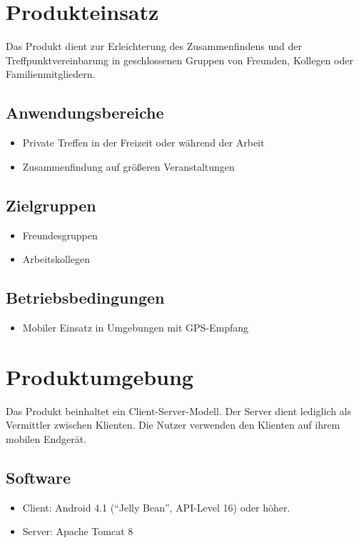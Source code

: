 \documentclass[parskip=full,11pt]{scrartcl}
\begin{document}
\pagebreak
\section{Produkteinsatz}
Das Produkt dient zur Erleichterung des Zusammenfindens und der
Treffpunktvereinbarung in geschlossenen Gruppen von Freunden, Kollegen oder
Familienmitgliedern.

\subsection{Anwendungsbereiche}
\begin{itemize}
    \item Private Treffen in der Freizeit oder während der Arbeit
    \item Zusammenfindung auf größeren Veranstaltungen
\end{itemize}

\subsection{Zielgruppen}
\begin{itemize}
    \item Freundesgruppen
    \item Arbeitskollegen
\end{itemize}

\subsection{Betriebsbedingungen}
\begin{itemize}
    \item Mobiler Einsatz in Umgebungen mit GPS-Empfang
\end{itemize}

\section{Produktumgebung}
Das Produkt beinhaltet ein Client-Server-Modell.
Der Server dient lediglich als Vermittler zwischen Klienten.
Die Nutzer verwenden den Klienten auf ihrem mobilen Endgerät.
\subsection{Software}
\begin{itemize}
    \item Client: Android 4.1 (\enquote{Jelly Bean}, API-Level 16) oder
        höher.
    \item Server: Apache Tomcat 8
\end{itemize}
\end{document}
